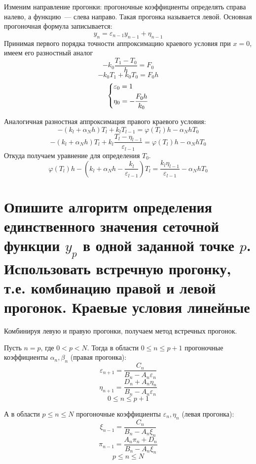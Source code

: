 Изменим направление прогонки: прогоночные коэффициенты определять справа налево, а функцию~--- слева направо. Такая прогонка называется левой. Основная прогоночная формула записывается:
\[y_n=\varepsilon_{n-1}y_{n-1}+\eta_{n-1}\]
Принимая первого порядка точности аппроксимацию краевого условия при $x=0$, имеем его разностный аналог
\[-k_0\frac{T_1-T_0}{h}=F_0\]
\[-k_0T_1+k_0T_0=F_0h\]
\begin{equation*}
 \begin{dcases}
   \varepsilon_0=1
   \\
   \eta_0=-\frac{F_0h}{k_0}
 \end{dcases}
\end{equation*}

Аналогичная разностная аппроксимация правого краевого условия:
\[-(k_l+\alpha_Nh)T_{l}+k_lT_{l-1}=\varphi(T_l)h-\alpha_NhT_0\]
\[-(k_l+\alpha_Nh)T_{l}+k_l\frac{T_{l}-\eta_{l-1}}{\varepsilon_{l-1}}=\varphi(T_l)h-\alpha_NhT_0\]
Откуда получаем уравнение для определения $T_0$. 
\[\varphi(T_l)h-(k_l+\alpha_Nh-\frac{k_l}{\varepsilon_{l-1}})T_l=\frac{k_l\eta_{l-1}}{\varepsilon_{l-1}}-\alpha_NhT_0\]

\section{Опишите алгоритм определения единственного значения сеточной функции $y_p$ в одной заданной точке $p$. Использовать встречную прогонку, т.е. комбинацию правой и левой прогонок. Краевые условия линейные}
Комбинируя левую и правую прогонки, получаем метод встречных прогонок.

Пусть $n=p$, где $0<p<N$. Тогда в области $0\le n \le p+1$ прогоночные коэффициенты $\alpha_n, \beta_n$ (правая прогонка):
\begin{equation*}
    \varepsilon_{n+1} = \frac{C_n}{B_n-A_n\varepsilon_n}
\end{equation*}
\begin{equation*}
    \eta_{n+1} = \frac{D_n + A_n \eta_n}{B_n - A_n \varepsilon_n}
\end{equation*}
\begin{equation*}
    0 \le n \le p+1
\end{equation*}

А в области $p\le n \le N$ прогоночные коэффициенты $\varepsilon_n, \eta_n$ (левая прогонка):
\begin{equation*}
    \xi_{n-1} = \frac{C_n}{B_n - A_n \xi_n}
\end{equation*}
\begin{equation*}
    \pi_{n-1} = \frac{A_n\pi_n + D_n}{B_n - A_n\xi_n}
\end{equation*}
\begin{equation*}
    p \le n \le N
\end{equation*}

